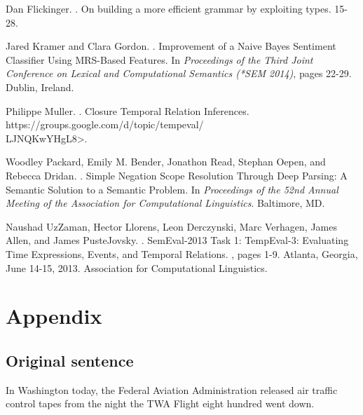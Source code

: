 \documentclass[11pt]{article}
\begin{document}
\begin{thebibliography}{}

Dan Flickinger.
.
\newblock On building a more efficient grammar by exploiting types.
 15-28.

Jared Kramer and Clara Gordon.
.
\newblock Improvement of a Naive Bayes Sentiment Classifier Using MRS-Based Features.
\newblock In {\em Proceedings of the Third Joint Conference on Lexical and Computational Semantics (*SEM 2014)}, pages 22-29.
\newblock Dublin, Ireland.

Philippe Muller.
.
\newblock Closure Temporal Relation Inferences.
\newblock {\textless}https://groups.google.com/d/topic/tempeval/\\LJNQKwYHgL8{\textgreater}.

Woodley Packard, Emily M. Bender, Jonathon Read, Stephan Oepen, and Rebecca Dridan.
.
\newblock Simple Negation Scope Resolution Through Deep Parsing: A Semantic Solution to a Semantic Problem.
\newblock In {\em Proceedings of the 52nd Annual Meeting of the Association for Computational Linguistics}.
\newblock Baltimore, MD.

Naushad UzZaman, Hector Llorens, Leon Derczynski, Marc Verhagen, James Allen, and James PusteJovsky.
.
\newblock SemEval-2013 Task 1: TempEval-3: Evaluating Time Expressions, Events, and Temporal Relations.
, pages 1-9.
\newblock Atlanta, Georgia, June 14-15, 2013.
\newblock Association for Computational Linguistics.

\end{thebibliography}

\onecolumn
\section*{Appendix}

\subsection*{Original sentence}
In Washington today, the Federal Aviation Administration released air traffic control tapes from the night the TWA Flight eight hundred went down.\\
\end{document}
